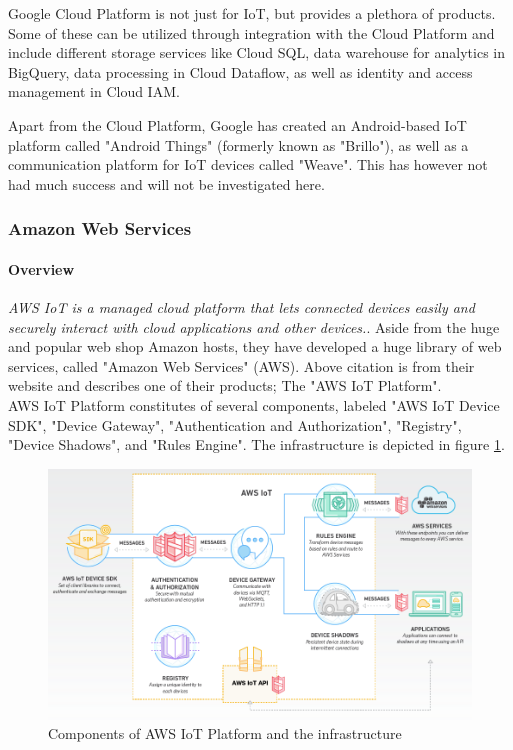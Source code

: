 Google Cloud Platform is not just for IoT, but provides a plethora of products. Some of these can be utilized through integration with the Cloud Platform and include different storage services like Cloud SQL, data warehouse for analytics in BigQuery, data processing in Cloud Dataflow, as well as identity and access management in Cloud IAM.

Apart from the Cloud Platform, Google has created an Android-based IoT platform called "Android Things" (formerly known as "Brillo"), as well as a communication platform for IoT devices called "Weave". This has however not had much success and will not be investigated here.


\subsubsection{Amazon Web Services}
\paragraph{Overview} \textit{AWS IoT is a managed cloud platform that lets connected devices easily and securely interact with cloud applications and other devices.}\cite{website:aws}.
Aside from the huge and popular web shop Amazon hosts, they have developed a huge library of web services, called "Amazon Web Services" (AWS). Above citation is from their website and describes one of their products; The "AWS IoT Platform". \\

AWS IoT Platform constitutes of several components, labeled "AWS IoT Device SDK", "Device Gateway", "Authentication and Authorization", "Registry", "Device Shadows", and "Rules Engine". The infrastructure is depicted in figure \ref{fig:aws:infrastructure}. \\

\begin{figure}[h!]
	\centering
	\includegraphics[width=\textwidth]{figures/aws/infrastructure.png}
	\caption{Components of AWS IoT Platform and the infrastructure}
	\label{fig:aws:infrastructure}
\end{figure}

